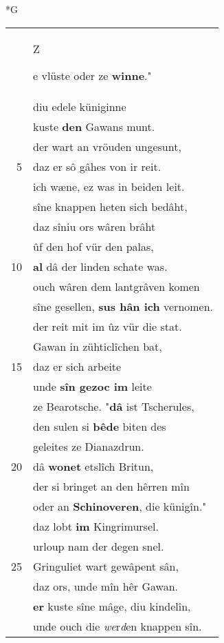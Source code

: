 \documentclass[8pt,a4paper,notitlepage]{article}
\begin{document}
\begin{table}[ht]
\begin{minipage}[t]{0.5\linewidth}
\small
\begin{center}*G
\end{center}
\begin{tabular}{rl}
 & \begin{large}Z\end{large}e vlüste oder ze \textbf{winne}."\\ 
 & diu edele küniginne\\ 
 & kuste \textbf{den} Gawans munt.\\ 
 & der wart an vröuden ungesunt,\\ 
5 & daz er sô gâhes von ir reit.\\ 
 & ich wæne, ez was in beiden leit.\\ 
 & sîne knappen heten sich bedâht,\\ 
 & daz sîniu ors wâren brâht\\ 
 & ûf den hof vür den palas,\\ 
10 & \textbf{al} dâ der linden schate was.\\ 
 & ouch wâren dem lantgrâven komen\\ 
 & sîne gesellen, \textbf{sus hân ich} vernomen.\\ 
 & der reit mit im ûz vür die stat.\\ 
 & Gawan in zühticlîchen bat,\\ 
15 & daz er sich arbeite\\ 
 & unde \textbf{sîn gezoc im} leite\\ 
 & ze Bearotsche. "\textbf{dâ} ist Tscherules,\\ 
 & den sulen si \textbf{bêde} biten des\\ 
 & geleites ze Dianazdrun.\\ 
20 & dâ \textbf{wonet} etslîch Britun,\\ 
 & der si bringet an den hêrren mîn\\ 
 & oder an \textbf{Schinoveren}, die künigîn."\\ 
 & daz lobt \textbf{im} Kingrimursel.\\ 
 & urloup nam der degen snel.\\ 
25 & Gringuliet wart gewâpent sân,\\ 
 & daz ors, unde mîn hêr Gawan.\\ 
 & \textbf{er} kuste sîne mâge, diu kindelîn,\\ 
 & unde ouch die \textit{we}r\textit{d}en knappen sîn.\\ 

\end{tabular}
\end{minipage}
\end{table}
\end{document}
